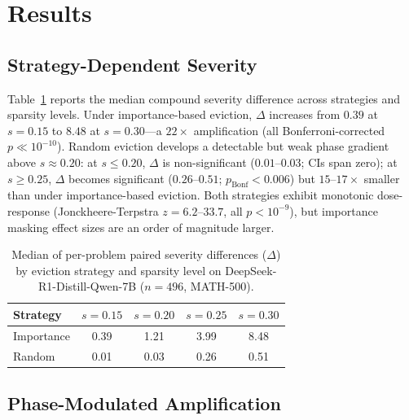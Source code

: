 
\section{Results}
\label{sec:results}

\subsection{Strategy-Dependent Severity}
\label{sec:strategy-severity}

Table~\ref{tab:aggregate-ii} reports the median compound severity difference across strategies and sparsity levels. Under importance-based eviction, $\Delta$ increases from $0.39$ at $s{=}0.15$ to $8.48$ at $s{=}0.30$---a $22{\times}$ amplification (all Bonferroni-corrected $p \ll 10^{-10}$). Random eviction develops a detectable but weak phase gradient above $s \approx 0.20$: at $s \leq 0.20$, $\Delta$ is non-significant ($0.01$--$0.03$; CIs span zero); at $s \geq 0.25$, $\Delta$ becomes significant ($0.26$--$0.51$; $p_{\text{Bonf}} < 0.006$) but $15$--$17{\times}$ smaller than under importance-based eviction. Both strategies exhibit monotonic dose-response (Jonckheere-Terpstra $z{=}6.2$--$33.7$, all $p < 10^{-9}$), but importance masking effect sizes are an order of magnitude larger.

\begin{table}[t]
\centering
\small
\caption{Median of per-problem paired severity differences ($\Delta$) by eviction strategy and sparsity level on DeepSeek-R1-Distill-Qwen-7B ($n{=}496$, MATH-500).}
\label{tab:aggregate-ii}
\begin{tabular}{@{}lcccc@{}}
\toprule
Strategy & $s{=}0.15$ & $s{=}0.20$ & $s{=}0.25$ & $s{=}0.30$ \\
\midrule
Importance & 0.39 & 1.21 & 3.99 & 8.48 \\
Random     & 0.01 & 0.03 & 0.26 & 0.51 \\
\bottomrule
\end{tabular}
\end{table}


\subsection{Phase-Modulated Amplification}
\label{sec:phase-amplification}

